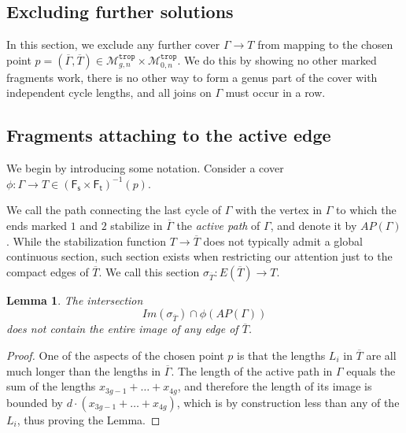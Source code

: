 \documentclass[11pt,reqno]{amsart}
\newtheorem{lemma}[theorem]{Lemma}
\theoremstyle{definition}
\newcommand{\rcolor}[1]{{\color{blue} #1}}
\newcommand\trop{{\mathtt{trop}}}
\newcommand\Mgn[1]{\mathcal M_{#1}}
\newcommand{\Ft}{\mathsf{F_t}}
\newcommand{\Fs}{\mathsf{F_s}}
\begin{document}
 
\subsection{Excluding further solutions}

\label{sec:exclude}
In this section, we exclude any further cover $\Gamma \to T$ from mapping to  the chosen point $p= (\overline{\Gamma},\overline{T})\in \Mgn{g,n}^\trop\times \Mgn{0,n}^\trop$. We do this by showing no other marked fragments work, there is no other way to form a genus part of the cover with independent cycle lengths, and all joins on $\Gamma$ must occur in a row. 

\subsection*{Fragments attaching to the active edge}
We begin by introducing some notation.
Consider a cover $\phi: \Gamma\to T\in (\Fs\times\Ft)^{-1}(p)$. 

We call  the path connecting the last cycle of $\Gamma$ with the vertex in $\Gamma$ to which the ends marked $1$ and $2$ stabilize in $\overline{\Gamma}$ the {\it active path} of $\Gamma$, and denote it by $AP(\Gamma)$.
 While the stabilization function $T\to \overline{T}$ does not typically admit a global continuous section, such section exists when restricting our attention just to the compact edges of $\overline{T}$. We call this section $\sigma_{\overline{T}}:E(\overline{T})\to T$.

 \begin{lemma}
   The intersection \begin{equation}\label{eq:inter} Im(\sigma_{\overline{T}})\cap \phi(AP(\Gamma)) \end{equation} does not contain the entire image of any edge of $\overline{T}$.
 \end{lemma}

\begin{proof}
 
    One of the aspects of the chosen point  $p$ is that the lengths $L_i$ in $\overline{T}$ are all much longer than the lengths in $\overline{\Gamma}$. The length of the active path in $\Gamma$ equals the sum of the lengths $x_{3g-1}+\ldots +x_{4g}$, and therefore
    the length of its image is bounded  by $d\cdot(x_{3g-1}+\ldots +x_{4g})$, which is by construction less  than any of the $L_i$, thus proving the Lemma. 
\end{proof}    
\end{document}
